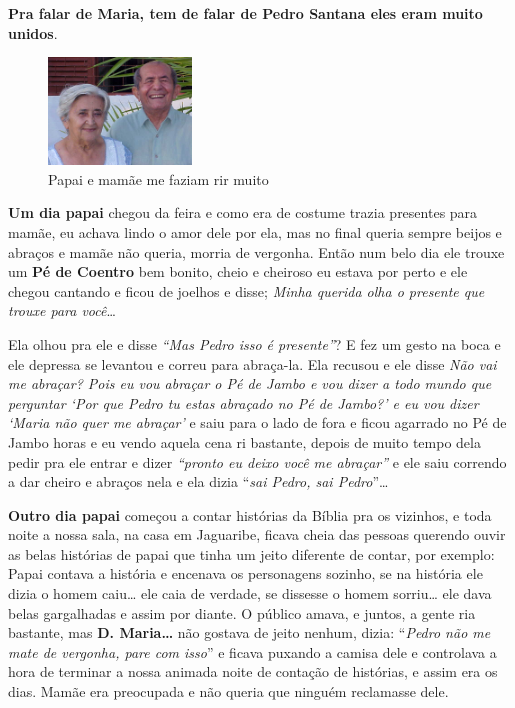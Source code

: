 \documentclass[
  brazil,
  a6paper,
  oneside,
  landscape,
  14pt]{scrbook}
\begin{document}
\textbf{Pra falar de Maria, tem de falar de Pedro Santana eles eram
muito unidos}.

\begin{figure}
\centering
\includegraphics[width=1.5in,height=1.12519in]{img/dora/image1.jpg}
\caption{Papai e mamãe me faziam rir muito}
\end{figure}

\textbf{Um dia papai} chegou da feira e como era de costume trazia
presentes para mamãe, eu achava lindo o amor dele por ela, mas no final
queria sempre beijos e abraços e mamãe não queria, morria de vergonha.
Então num belo dia ele trouxe um \textbf{Pé de Coentro} bem bonito,
cheio e cheiroso eu estava por perto e ele chegou cantando e ficou de
joelhos e disse; \emph{Minha querida olha o presente que trouxe para
você}\ldots{}

Ela olhou pra ele e disse \emph{``Mas Pedro isso é presente''}? E fez um
gesto na boca e ele depressa se levantou e correu para abraça-la. Ela
recusou e ele disse \emph{Não vai me abraçar? Pois eu vou abraçar o Pé
de Jambo e vou dizer a todo mundo que perguntar `Por que Pedro tu estas
abraçado no Pé de Jambo?' e eu vou dizer `Maria não quer me abraçar'} e
saiu para o lado de fora e ficou agarrado no Pé de Jambo horas e eu
vendo aquela cena ri bastante, depois de muito tempo dela pedir pra ele
entrar e dizer \emph{``pronto eu deixo você me abraçar''} e ele saiu
correndo a dar cheiro e abraços nela e ela dizia ``\emph{sai Pedro, sai
Pedro}''\ldots{}

\textbf{Outro dia papai} começou a contar histórias da Bíblia pra os
vizinhos, e toda noite a nossa sala, na casa em Jaguaribe, ficava cheia
das pessoas querendo ouvir as belas histórias de papai que tinha um
jeito diferente de contar, por exemplo: Papai contava a história e
encenava os personagens sozinho, se na história ele dizia o homem
caiu\ldots{} ele caia de verdade, se dissesse o homem sorriu\ldots{} ele
dava belas gargalhadas e assim por diante. O público amava, e juntos, a
gente ria bastante, mas \textbf{D. Maria\ldots{}} não gostava de jeito
nenhum, dizia: ``\emph{Pedro não me mate de vergonha, pare com isso}'' e
ficava puxando a camisa dele e controlava a hora de terminar a nossa
animada noite de contação de histórias, e assim era os dias. Mamãe era
preocupada e não queria que ninguém reclamasse dele.
\end{document}
